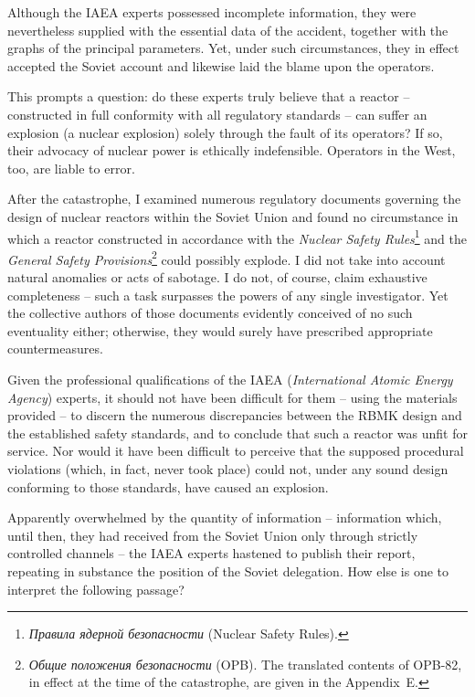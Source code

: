 \documentclass[openright]{bookest}
\begin{document}
Although the IAEA experts possessed incomplete information, they were nevertheless supplied with the essential data of the accident, together with the graphs of the principal parameters. Yet, under such circumstances, they in effect accepted the Soviet account and likewise laid the blame upon the operators.

This prompts a question: do these experts truly believe that a reactor -- constructed in full conformity with all regulatory standards -- can suffer an explosion (a nuclear explosion) solely through the fault of its operators? If so, their advocacy of nuclear power is ethically indefensible. Operators in the West, too, are liable to error.


After the catastrophe, I examined numerous regulatory documents governing the design of nuclear reactors within the Soviet Union and found no circumstance in which a reactor constructed in accordance with the \textit{Nuclear Safety Rules}\footnote{\textit{Правила ядерной безопасности} (Nuclear Safety Rules).} and the \textit{General Safety Provisions}\footnote{\textit{Общие положения безопасности} (OPB). The translated contents of OPB-82, in effect at the time of the catastrophe, are given in the Appendix~E.} could possibly explode. I did not take into account natural anomalies or acts of sabotage. I do not, of course, claim exhaustive completeness -- such a task surpasses the powers of any single investigator. Yet the collective authors of those documents evidently conceived of no such eventuality either; otherwise, they would surely have prescribed appropriate countermeasures.

Given the professional qualifications of the IAEA (\textit{International Atomic Energy Agency}) experts, it should not have been difficult for them -- using the materials provided -- to discern the numerous discrepancies between the RBMK design and the established safety standards, and to conclude that such a reactor was unfit for service. Nor would it have been difficult to perceive that the supposed procedural violations (which, in fact, never took place) could not, under any sound design conforming to those standards, have caused an explosion.

Apparently overwhelmed by the quantity of information -- information which, until then, they had received from the Soviet Union only through strictly controlled channels -- the IAEA experts hastened to publish their report, repeating in substance the position of the Soviet delegation. How else is one to interpret the following passage?
\end{document}
